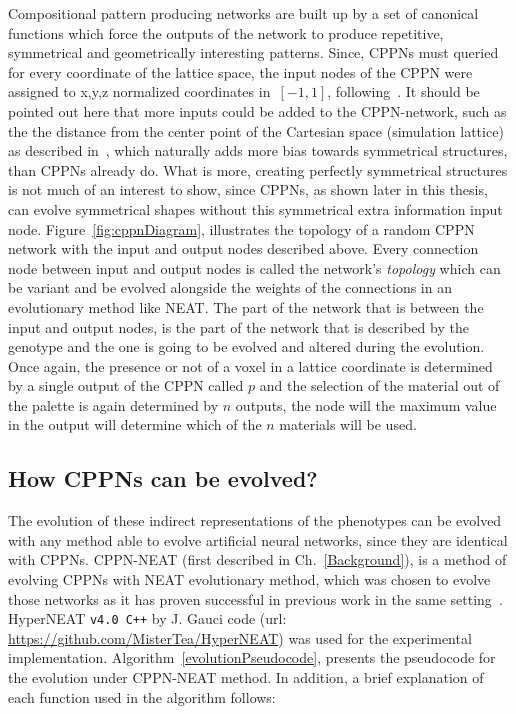 Compositional pattern producing networks are built up by a set of canonical functions which force the outputs of the network to produce repetitive, symmetrical and geometrically interesting patterns. Since, CPPNs must queried for every coordinate of the lattice space, the input nodes of the CPPN were assigned to x,y,z normalized coordinates in~$[-1, 1]$, following~\cite{cheney2013unshackling}. It should be pointed out here that more inputs could be added to the CPPN-network, such as the the distance from the center point of the Cartesian space (simulation lattice) as described in~\cite{stanley2007compositional}, which naturally adds more bias towards symmetrical structures, than CPPNs already do. What is more, creating perfectly symmetrical structures is not much of an interest to show, since CPPNs, as shown later in this thesis, can evolve symmetrical shapes without this symmetrical extra information input node. Figure~\ref{fig:cppnDiagram}, illustrates the topology of a random CPPN network with the input and output nodes described above. Every connection node between input and output nodes is called the network's \emph{topology} which can be variant and be evolved alongside the weights of the connections in an evolutionary method like NEAT. The part of the network that is between the input and output nodes, is the part of the network that is described by the genotype and the one is going to be evolved and altered during the evolution. Once again, the presence or not of a voxel in a lattice coordinate is determined by a single output of the CPPN called $p$ and the selection of the material out of the palette is again determined by $n$ outputs, the node will the maximum value in the output will determine which of the $n$ materials will be used.

\subsection{How CPPNs can be evolved?}
The evolution of these indirect representations of the phenotypes can be evolved with any method able to evolve artificial neural networks, since they are identical with CPPNs. CPPN-NEAT (first described in Ch.~\ref{Background}), is a method of evolving CPPNs with NEAT evolutionary method, which was chosen to evolve those networks as it has proven successful in previous work in the same setting~\cite{cheney2013unshackling}. HyperNEAT \texttt{v4.0 C++} by J. Gauci code (url: \url{https://github.com/MisterTea/HyperNEAT}) was used for the experimental implementation. Algorithm~\ref{evolutionPseudocode}, presents the pseudocode for the evolution under CPPN-NEAT method. In addition, a brief explanation of each function used in the algorithm follows:


